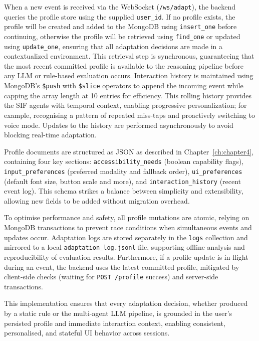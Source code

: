 When a new event is received via the WebSocket (\texttt{/ws/adapt}), the backend queries the profile store using the supplied \texttt{user\_id}. If no profile exists, the profile will be created and added to the MongoDB using \texttt{insert\_one} before continuing, otherwise the profile will be retrieved using \texttt{find\_one} or updated using \texttt{update\_one}, ensuring that all adaptation decisions are made in a contextualized environment. This retrieval step is synchronous, guaranteeing that the most recent committed profile is available to the reasoning pipeline before any LLM or rule-based evaluation occurs. Interaction history is maintained using MongoDB’s \texttt{\$push} with \texttt{\$slice} operators to append the incoming event while capping the array length at 10 entries for efficiency. This rolling history provides the SIF agents with temporal context, enabling progressive personalization; for example, recognising a pattern of repeated miss-taps and proactively switching to voice mode. Updates to the history are performed asynchronously to avoid blocking real-time adaptation.

Profile documents are structured as JSON as described in Chapter~\ref{ch:chapter4}, containing four key sections: \texttt{accessibility\_needs} (boolean capability flags), \texttt{input\_preferences} (preferred modality and fallback order), \texttt{ui\_preferences} (default font size, button scale and more), and \texttt{interaction\_history} (recent event log). This schema strikes a balance between simplicity and extensibility, allowing new fields to be added without migration overhead.

To optimise performance and safety, all profile mutations are atomic, relying on MongoDB transactions to prevent race conditions when simultaneous events and updates occur. Adaptation logs are stored separately in the \texttt{logs} collection and mirrored to a local \texttt{adaptation\_log.jsonl} file, supporting offline analysis and reproducibility of evaluation results. Furthermore, if a profile update is in-flight during an event, the backend uses the latest committed profile, mitigated by client-side checks (waiting for \texttt{POST /profile} success) and server-side transactions.

This implementation ensures that every adaptation decision, whether produced by a static rule or the multi-agent LLM pipeline, is grounded in the user’s persisted profile and immediate interaction context, enabling consistent, personalised, and stateful UI behavior across sessions.

